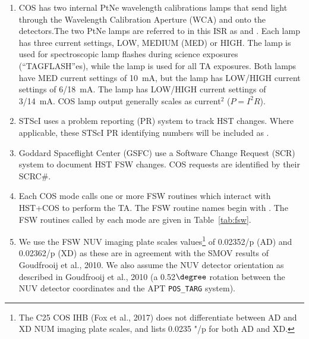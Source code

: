 \begin{enumerate}
{	}
	\item{COS has two internal PtNe wavelength calibrations lamps that send light through the Wavelength Calibration Aperture (WCA) and onto the detectors.The two PtNe lamps are referred to in this ISR
	as \plampone{} and \plamptwo{}. Each lamp has three current settings, LOW, MEDIUM (MED) or HIGH. The \plampone{} lamp is used for spectroscopic lamp flashes during science exposures (``TAGFLASH''es), while the \plamptwo{} lamp is used for all TA exposures.
	Both lamps have MED current settings of 10~mA, but the \plampone{} lamp has LOW/HIGH current settings of 6/18~mA. The \plamptwo{} lamp
	has LOW/HIGH current settings of 3/14~mA. COS lamp output generally scales as current$^{2}$ ($P=I^2 R$).}
	\item{STScI uses a problem reporting (PR) system to track HST changes.
		Where applicable, these STScI PR identifying numbers will be included as \pr{}.}
	\item{Goddard Spaceflight Center (GSFC) use a Software Change Request (SCR) system to document HST FSW changes.
	COS requests are identified by their SCRC\#. }
	\item{Each COS \tacq{} mode calls one or more FSW routines which interact with HST+COS to perform the TA.
		The FSW routine names begin with \fsw{}.
		The FSW routines called by each \tacq{} mode are given in Table~\ref{tab:fsw}.
		}
	\item{We use the FSW NUV imaging plate scales values\footnote{The C25 COS IHB (Fox et al., 2017) does not differentiate between AD and XD NUM imaging plate scales, and lists 0.0235 "/p for both AD and XD.} of 0.02352\arcsec/p (AD) and 0.02362\arcsec/p (XD) as these
	are in agreement with the SMOV results of Goudfrooij et al., 2010. We also assume
	the NUV detector orientation as described in Goudfrooij et al., 2010 (a 0.52$\degree$ rotation between the
	NUV detector coordinates and the APT \texttt{POS\_TARG} system). }
\end{enumerate}

